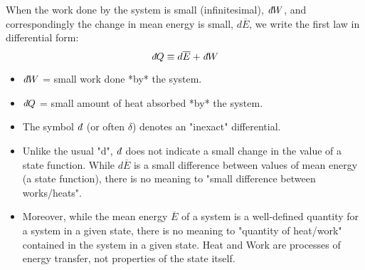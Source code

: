 \documentclass[11pt]{article}
\newcommand{\avg}[1]{\overline{#1}}
\newcommand{\ethbar}{\text{\it{đ}}} %
\begin{document}
When the work done by the system is small (infinitesimal), $\ethbar W$, and correspondingly the change in mean energy is small, $d\avg{E}$, we write the first law in differential form:
\[ \ethbar Q \equiv d\avg{E} + \ethbar W \]
\begin{itemize}
    \item $\ethbar W$ = small work done *by* the system.
    \item $\ethbar Q$ = small amount of heat absorbed *by* the system.
    \item The symbol $\ethbar$ (or often $\delta$) denotes an "inexact" differential.
    \item Unlike the usual "d", $\ethbar$ does not indicate a small change in the value of a state function. While $d\avg{E}$ is a small difference between values of mean energy (a state function), there is no meaning to "small difference between works/heats".
    \item Moreover, while the mean energy $\avg{E}$ of a system is a well-defined quantity for a system in a given state, there is no meaning to "quantity of heat/work" contained in the system in a given state. Heat and Work are processes of energy transfer, not properties of the state itself.
\end{itemize}
\end{document}
